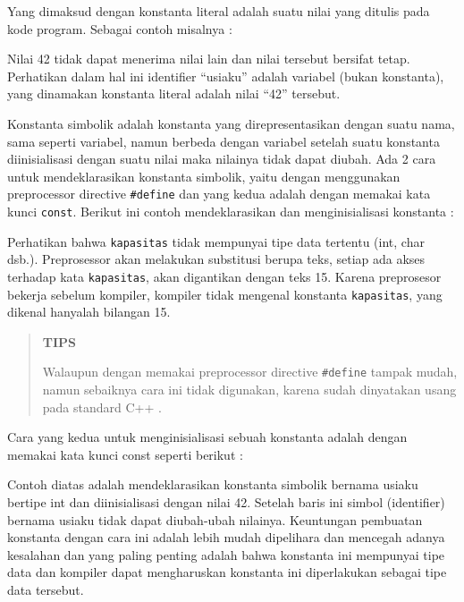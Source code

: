 

Yang dimaksud dengan konstanta literal adalah suatu nilai yang ditulis
pada kode program. Sebagai contoh misalnya :



Nilai 42 tidak dapat menerima nilai lain dan nilai tersebut bersifat
tetap. Perhatikan dalam hal ini identifier ``usiaku'' adalah variabel
(bukan konstanta), yang dinamakan konstanta literal adalah nilai ``42''
tersebut.

Konstanta simbolik adalah konstanta yang direpresentasikan dengan suatu
nama, sama seperti variabel, namun berbeda dengan variabel setelah suatu
konstanta diinisialisasi dengan suatu nilai maka nilainya tidak dapat
diubah. Ada 2 cara untuk mendeklarasikan konstanta simbolik, yaitu
dengan menggunakan preprocessor directive \texttt{\#define} dan yang
kedua adalah dengan memakai kata kunci \texttt{const}. Berikut ini
contoh mendeklarasikan dan menginisialisasi konstanta :



Perhatikan bahwa \texttt{kapasitas} tidak mempunyai tipe data tertentu
(int, char dsb.). Preprosessor akan melakukan substitusi berupa teks,
setiap ada akses terhadap kata \texttt{kapasitas}, akan digantikan
dengan teks 15. Karena preprosesor bekerja sebelum kompiler, kompiler
tidak mengenal konstanta \texttt{kapasitas}, yang dikenal hanyalah
bilangan 15.

\begin{quotation}
{\LARGE {}}\textbf{TIPS}

Walaupun
dengan memakai preprocessor directive \texttt{\#define} tampak mudah,
namun sebaiknya cara ini tidak digunakan, karena sudah dinyatakan usang
pada standard C++ .
\end{quotation}


Cara yang kedua untuk menginisialisasi sebuah konstanta adalah dengan
memakai kata kunci const seperti berikut :



Contoh diatas adalah mendeklarasikan konstanta simbolik bernama usiaku
bertipe int dan diinisialisasi dengan nilai 42. Setelah baris ini simbol
(identifier) bernama usiaku tidak dapat diubah-ubah nilainya. Keuntungan
pembuatan konstanta dengan cara ini adalah lebih mudah dipelihara dan
mencegah adanya kesalahan dan yang paling penting adalah bahwa konstanta
ini mempunyai tipe data dan kompiler dapat mengharuskan konstanta ini
diperlakukan sebagai tipe data tersebut.

